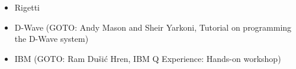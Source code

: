 \documentclass{beamer}
\begin{document}
\begin{frame}{\insertsection}
  \begin{itemize}
    \item Rigetti 
    \item D-Wave (GOTO: Andy Mason and Sheir Yarkoni, Tutorial on programming the D-Wave system) 
    \item IBM (GOTO: Ram Du\v{s}i\'c Hren, IBM Q Experience: Hands-on workshop)
  \end{itemize}
\end{frame}


\begin{frame}{}
	
\end{frame}


\begin{frame}{}
	
\end{frame}


\begin{frame}{}
	
\end{frame}


\begin{frame}{}
	
\end{frame}


\begin{frame}{}
	
\end{frame}


\begin{frame}{}
	
\end{frame}


\begin{frame}{}
	
\end{frame}


\begin{frame}{}
	
\end{frame}


\begin{frame}{}
	
\end{frame}
\end{document}
